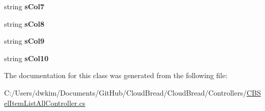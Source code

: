 \begin{DoxyCompactItemize}
\item 
string {\bfseries s\+Col7}\hypertarget{a00155_a9ad0dcd4ebe93135410a67c245348b7e}{}\label{a00155_a9ad0dcd4ebe93135410a67c245348b7e}

\item 
string {\bfseries s\+Col8}\hypertarget{a00155_a6479917e648e1d19e60987f3a8c97439}{}\label{a00155_a6479917e648e1d19e60987f3a8c97439}

\item 
string {\bfseries s\+Col9}\hypertarget{a00155_a46ca0e869c33196c867790bf644e060f}{}\label{a00155_a46ca0e869c33196c867790bf644e060f}

\item 
string {\bfseries s\+Col10}\hypertarget{a00155_a39b2bba3ddcf42e377a7cee4e1a99168}{}\label{a00155_a39b2bba3ddcf42e377a7cee4e1a99168}

\end{DoxyCompactItemize}


The documentation for this class was generated from the following file\+:\begin{DoxyCompactItemize}
\item 
C\+:/\+Users/dwkim/\+Documents/\+Git\+Hub/\+Cloud\+Bread/\+Cloud\+Bread/\+Controllers/\hyperlink{a00220}{C\+B\+Sel\+Item\+List\+All\+Controller.\+cs}\end{DoxyCompactItemize}
